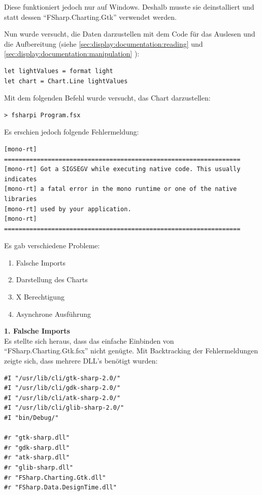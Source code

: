 Diese funktioniert jedoch nur auf Windows.
Deshalb musste sie deinstalliert und statt dessen "`FSharp.Charting.Gtk"' verwendet werden.

Nun wurde versucht, die Daten darzustellen mit dem Code für das Auslesen und die Aufbereitung (siehe \cref{sec:display:documentation:reading}  und \cref{sec:display:documentation:manipulation} ):
\begin{lstlisting}
let lightValues = format light
let chart = Chart.Line lightValues
\end{lstlisting}

Mit dem folgenden Befehl wurde versucht, das Chart darzustellen:
\begin{lstlisting}
> fsharpi Program.fsx
\end{lstlisting}

Es erschien jedoch folgende Fehlermeldung:
\begin{lstlisting}
[mono-rt] =================================================================
[mono-rt] Got a SIGSEGV while executing native code. This usually indicates
[mono-rt] a fatal error in the mono runtime or one of the native libraries 
[mono-rt] used by your application.
[mono-rt] =================================================================
\end{lstlisting}

Es gab verschiedene Probleme:
\begin{enumerate}
\item Falsche Imports
\item Darstellung des Charts
\item X Berechtigung
\item Asynchrone Ausführung
\end{enumerate}

\textbf{1. Falsche Imports} \\
Es stellte sich heraus, dass das einfache Einbinden von "`FSharp.Charting.Gtk.fsx"' nicht genügte.
Mit Backtracking der Fehlermeldungen zeigte sich, dass mehrere DLL's benötigt wurden:
\begin{lstlisting}
#I "/usr/lib/cli/gtk-sharp-2.0/"
#I "/usr/lib/cli/gdk-sharp-2.0/"
#I "/usr/lib/cli/atk-sharp-2.0/"
#I "/usr/lib/cli/glib-sharp-2.0/"
#I "bin/Debug/"

#r "gtk-sharp.dll"
#r "gdk-sharp.dll"
#r "atk-sharp.dll"
#r "glib-sharp.dll"
#r "FSharp.Charting.Gtk.dll"
#r "FSharp.Data.DesignTime.dll"
\end{lstlisting}

